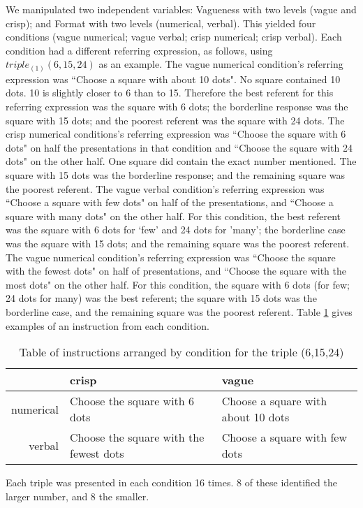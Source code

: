 \documentclass[man,floatmark]{apa}
\begin{document}
We manipulated two independent variables: Vagueness with two levels (vague and crisp); and Format with two levels (numerical, verbal). This yielded four conditions (vague numerical; vague verbal; crisp numerical; crisp verbal). Each condition had a different referring expression, as follows, using $triple_{(1)}(6,15,24)$ as an example. 
The vague numerical condition's referring expression was ``Choose a square with about 10 dots". No square contained 10 dots. 10 is slightly closer to 6 than to 15. Therefore the best referent for this referring expression was the square with 6 dots;  the borderline response was the square with 15 dots; and the poorest referent was the square with 24 dots. The crisp numerical conditions's referring expression was ``Choose the square with 6 dots" on half the presentations in that condition and ``Choose the square with 24 dots" on the other half. One square did contain the exact number mentioned. The square with 15 dots was the borderline response; and the remaining square was the poorest referent. The vague verbal condition's referring expression was ``Choose a square with few dots" on half of the presentations, and ``Choose a square with many dots" on the other half. For this condition, the best referent was the square with 6 dots for `few' and 24 dots for 'many'; the borderline case was the square with 15 dots; and the remaining square was the poorest referent. The vague numerical condition's referring expression was ``Choose the square with the fewest dots" on half of presentations, and ``Choose the square with the most dots" on the other half. For this condition, the square with 6 dots (for few; 24 dots for many) was the best referent; the square with 15 dots was the borderline case, and the remaining square was the poorest referent. Table \ref{instre3} gives examples of an instruction from each condition.


\begin{table}[tbp]
\caption{Table of instructions arranged by condition for the triple (6,15,24)}
\label{instre3}
\begin{tabular}{rll}
&crisp&vague\\
\hline
numerical&Choose the square with 6 dots 		& 	Choose a square with about 10 dots			\\
verbal&Choose the square with the fewest dots			&		Choose a square with few dots\\
\end{tabular}
\end{table}

Each triple was presented in each condition 16 times. 8 of these identified the larger number, and 8 the smaller.
\end{document}
